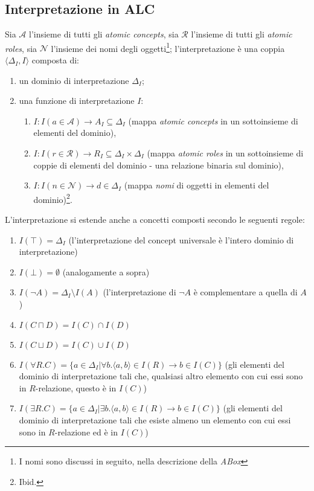 \subsection{Interpretazione in ALC}
Sia $\mathcal{A}$ l'insieme di tutti gli \textit{atomic concepts}, sia $\mathcal{R}$ l'insieme di tutti gli \textit{atomic roles}, sia $\mathcal{N}$ l'insieme dei nomi degli oggetti\footnote{I nomi sono discussi in seguito, nella descrizione della \textit{ABox}}; l'interpretazione è una coppia $\langle \Delta_I, I \rangle$ composta di:
\begin{enumerate}
\item un dominio di interpretazione $\Delta_I$;
\item una funzione di interpretazione $I$: 
\begin{enumerate}
\item $I: I(a \in \mathcal{A}) \to A_I \subseteq \Delta_I$ (mappa \textit{atomic concepts} in un sottoinsieme di elementi del dominio),
\item $I: I(r \in \mathcal{R}) \to R_I \subseteq \Delta_I \times \Delta_I$ (mappa \textit{atomic roles} in un sottoinsieme di coppie di elementi del dominio - una relazione binaria sul dominio),
\item $I: I(n \in \mathcal{N}) \to d \in \Delta_I$ (mappa \textit{nomi} di oggetti in elementi del dominio)\footnote{Ibid.}.
\end{enumerate}
\end{enumerate}

L'interpretazione si estende anche a concetti composti secondo le seguenti regole:
\begin{enumerate}
\item $I(\top) = \Delta_I$ (l'interpretazione del concept universale è l'intero dominio di interpretazione)
\item $I(\bot) = \emptyset$ (analogamente a sopra)
\item $I(\lnot A) = \Delta_I \setminus I(A)$ (l'interpretazione di $\lnot A$ è complementare a quella di $A$)
\item $I(C \sqcap D) = I(C) \cap I(D)$
\item $I(C \sqcup D) = I(C) \cup I(D)$
\item $I(\forall R. C) = \lbrace a \in \Delta_I | \forall b. \langle a, b \rangle \in I(R) \to b \in I(C) \rbrace$ (gli elementi del dominio di interpretazione tali che, qualsiasi altro elemento con cui essi sono in $R$-relazione, questo è in $I(C)$)
\item $I(\exists R. C) = \lbrace a \in \Delta_I | \exists b. \langle a, b \rangle \in I(R) \to b \in I(C) \rbrace$ (gli elementi del dominio di interpretazione tali che esiste almeno un elemento con cui essi sono in $R$-relazione ed è in $I(C)$)
\end{enumerate}

